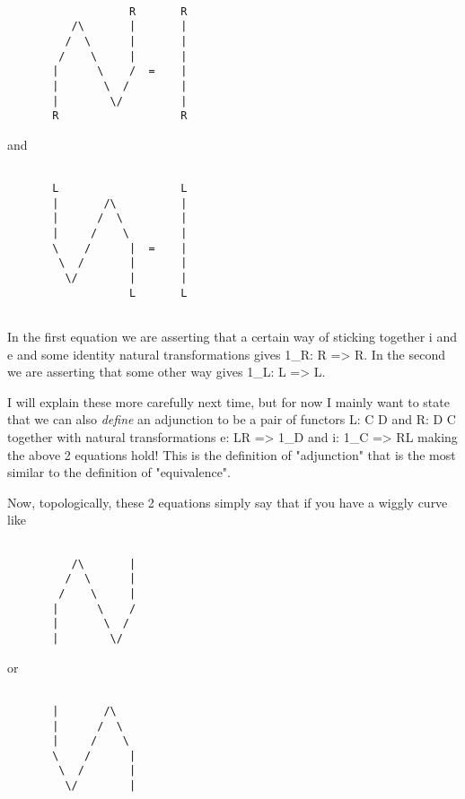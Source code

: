 \begin{verbatim}

                   R       R
          /\       |       |
         /  \      |       |
        /    \     |       |
       |      \    /  =    | 
       |       \  /        |
       |        \/         |
       R                   R

\end{verbatim}
    
and


\begin{verbatim}

       L                   L
       |       /\          |
       |      /  \         |
       |     /    \        |
       \    /      |  =    | 
        \  /       |       |
         \/        |       |
                   L       L
                    
\end{verbatim}
    

In the first equation we are asserting that a certain way of sticking
together i and e and some identity natural transformations gives
1_{R}: R => R.  In the second we are asserting that some
other way gives 1_{L}: L => L.


I will explain these more carefully next time, but for now I mainly want
to state that we can also \emph{define} an adjunction to be a pair of
functors L: C \to  D and R: D \to  C together with natural
transformations e: LR => 1_{D} and i: 1_{C} => RL
making the above 2 equations hold!  This is the definition of
"adjunction" that is the most similar to the definition of
"equivalence".

Now, topologically, these 2 equations simply say that if you have a wiggly
curve like


\begin{verbatim}

          /\       |       
         /  \      |       
        /    \     |       
       |      \    /  
       |       \  /        
       |        \/         

\end{verbatim}
    
or


\begin{verbatim}

       |       /\          
       |      /  \         
       |     /    \        
       \    /      |   
        \  /       |       
         \/        |       

\end{verbatim}
    
